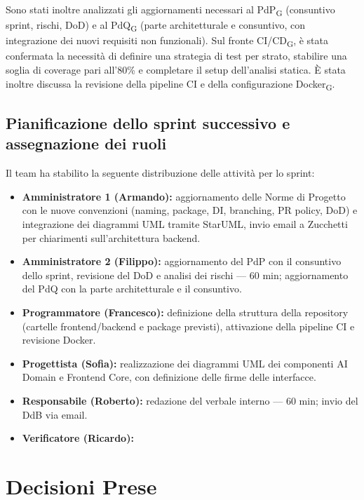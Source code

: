 Sono stati inoltre analizzati gli aggiornamenti necessari al PdP\textsubscript{G} (consuntivo sprint, rischi, DoD) e al PdQ\textsubscript{G} (parte architetturale e consuntivo, con integrazione dei nuovi requisiti non funzionali).  
Sul fronte CI/CD\textsubscript{G}, è stata confermata la necessità di definire una strategia di test per strato, stabilire una soglia di coverage pari all’80\% e completare il setup dell’analisi statica. È stata inoltre discussa la revisione della pipeline CI e della configurazione Docker\textsubscript{G}.

\subsection{Pianificazione dello sprint successivo e assegnazione dei ruoli}
Il team ha stabilito la seguente distribuzione delle attività per lo sprint:
\begin{itemize}
    \item \textbf{Amministratore 1 (Armando):} aggiornamento delle Norme di Progetto con le nuove convenzioni (naming, package, DI, branching, PR policy, DoD) e integrazione dei diagrammi UML tramite StarUML, invio email a Zucchetti per chiarimenti sull’architettura backend.
    \item \textbf{Amministratore 2 (Filippo):} aggiornamento del PdP con il consuntivo dello sprint, revisione del DoD e analisi dei rischi — 60 min; aggiornamento del PdQ con la parte architetturale e il consuntivo.
    \item \textbf{Programmatore (Francesco):} definizione della struttura della repository (cartelle frontend/backend e package previsti), attivazione della pipeline CI e revisione Docker.
    \item \textbf{Progettista (Sofia):} realizzazione dei diagrammi UML dei componenti AI Domain e Frontend Core, con definizione delle firme delle interfacce.
    \item \textbf{Responsabile (Roberto):} redazione del verbale interno — 60 min; invio del DdB via email.
    \item \textbf{Verificatore (Ricardo):} 
\end{itemize}

\section{Decisioni Prese}

